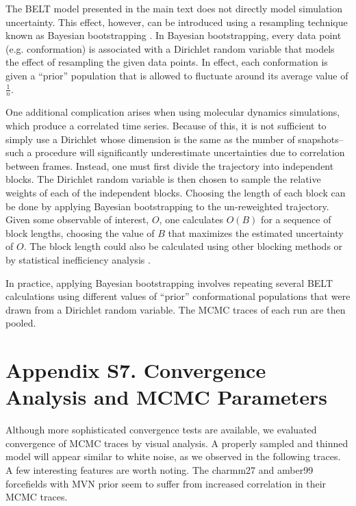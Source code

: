\documentclass[journal=jacsat,manuscript=article]{achemso}
\begin{document}
The BELT model presented in the main text does not directly model simulation uncertainty.  This effect, however, can be introduced using a resampling technique known as Bayesian bootstrapping \cite{rubin1981}.  In Bayesian bootstrapping, every data point (e.g. conformation) is associated with a Dirichlet random variable that models the effect of resampling the given data points.  In effect, each conformation is given a ``prior'' population that is allowed to fluctuate around its average value of $\frac{1}{n}$.  

One additional complication arises when using molecular dynamics simulations, which produce a correlated time series.  Because of this, it is not sufficient to simply use a Dirichlet whose dimension is the same as the number of snapshots--such a procedure will significantly underestimate uncertainties due to correlation between frames.  Instead, one must first divide the trajectory into independent blocks.  The Dirichlet random variable is then chosen to sample the relative weights of each of the independent blocks.  Choosing the length of each block can be done by applying Bayesian bootstrapping to the un-reweighted trajectory.  Given some observable of interest, $O$, one calculates $O(B)$ for a sequence of block lengths, choosing the value of $B$ that maximizes the estimated uncertainty of $O$.  The block length could also be calculated using other blocking methods \cite{flyvbjerg1989error} or by statistical inefficiency analysis \cite{shirts2008}.  

In practice, applying Bayesian bootstrapping involves repeating several BELT calculations using different values of ``prior'' conformational populations that were drawn from a Dirichlet random variable.  The MCMC traces of each run are then pooled.  

\newpage

\section{Appendix S7.  Convergence Analysis and MCMC Parameters}

Although more sophisticated convergence tests are available, we evaluated convergence of MCMC traces by visual analysis.  A properly sampled and thinned model will appear similar to white noise, as we observed in the following traces.  A few interesting features are worth noting.  The charmm27 and amber99 forcefields with MVN prior seem to suffer from increased correlation in their MCMC traces.  
\end{document}
